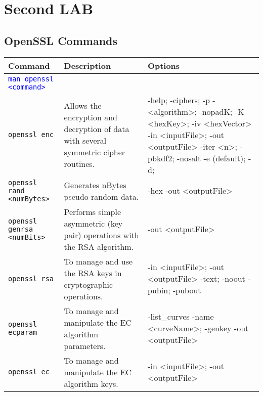 \section{Second LAB}
\cite{LAB2}
\subsection{OpenSSL Commands}

\begin{table}[]
	\centering
    \begin{tabular}{|p{6cm}|p{3cm}|p{7cm}|}\hline
        \rowcolor{gray!30}
		\textbf{Command} & \textbf{Description} & \textbf{Options} \\ \hline
		\textcolor{Blue}{\texttt{man openssl <command>}} 
			& 
			& 
			\\ \hline
        \texttt{openssl enc} 
			& Allows the encryption and decryption of data with several symmetric cipher
        routines. 
			& -help; -ciphers; -p
				\newline -<algorithm>; -nopadK;
				\newline -K <hexKey>; -iv <hexVector>
				\newline -in <inputFile>; -out <outputFile>
				\newline -iter <n>; -pbkdf2; -nosalt
				\newline -e (default); -d; 
				\\ \hline
        \texttt{openssl rand <numBytes>} 
			& Generates nBytes pseudo-random data.
			& -hex
				\newline -out <outputFile>
			\\ \hline
        \texttt{openssl genrsa <numBits>} 
			& Performs simple asymmetric (key pair) operations with the RSA algorithm.
			& -out <outputFile>
			\\ \hline
		\texttt{openssl rsa} 
			& To manage and use the RSA keys in cryptographic operations.
			& -in <inputFile>; -out <outputFile>
				\newline -text; -noout
				\newline -pubin; -pubout
			\\ \hline
		\texttt{openssl ecparam} 
			& To manage and manipulate the EC algorithm parameters.
			& -list\_curves
				\newline -name <curveName>; -genkey
				\newline -out <outputFile>
			\\ \hline
		\texttt{openssl ec} 
			& To manage and manipulate the EC algorithm keys.
			& -in <inputFile>; -out <outputFile>

\end{tabular}
\end{table}
